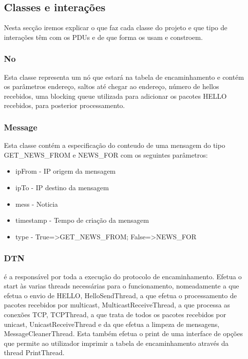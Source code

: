 \documentclass{llncs}
\begin{document}
\subsection{Classes e interações}

Nesta secção iremos explicar o que faz cada classe do projeto e que tipo de interações têm com os PDUs e de que forma os usam e constroem.

\subsubsection{No} Esta classe representa um nó que estará na tabela de encaminhamento e contém os parâmetros endereço, saltos até chegar ao endereço, número de hellos recebidos, uma blocking queue utilizada para adicionar os pacotes HELLO recebidos, para posterior processamento.

\subsubsection{Message} Esta classe contém a especificação do conteudo de uma mensagem do tipo GET\_NEWS\_FROM e NEWS\_FOR com os seguintes parâmetros:
\begin{itemize}
    \item ipFrom - IP origem da mensagem
    \item ipTo - IP destino da mensagem
    \item mess - Noticia
    \item timestamp - Tempo de criação da mensagem
    \item type - True=>GET\_NEWS\_FROM; False=>NEWS\_FOR
\end{itemize}


\subsubsection{DTN} é a responsável por toda a execução do protocolo de encaminhamento. Efetua o start às varias threads necessárias para o funcionamento, nomeadamente a que efetua o envio de HELLO, HelloSendThread, a que efetua o processamento de pacotes recebidos por multicast, MulticastReceiveThread, a que processa as conexões TCP, TCPThread, a que trata de todos os pacotes recebidos por unicast, UnicastReceiveThread e da que efetua a limpeza de mensagens, MessageCleanerThread. Esta também efetua o print de uma interface de opções que permite ao utilizador imprimir a tabela de encaminhamento através da thread PrintThread.
\end{document}
